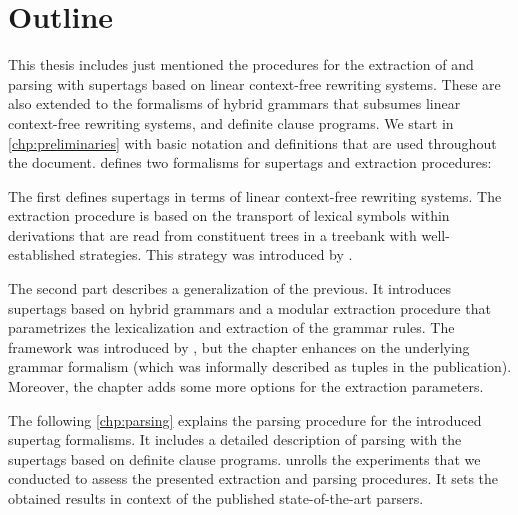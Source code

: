 \documentclass[../document.tex]{subfiles}
\begin{document}
    \section*{Outline}
    This thesis includes just mentioned the procedures for the extraction of and parsing with supertags based on linear context-free rewriting systems.
    These are also extended to the formalisms of hybrid grammars that subsumes linear context-free rewriting systems, and definite clause programs.
    We start in \cref{chp:preliminaries} with basic notation and definitions that are used throughout the document.
     defines two formalisms for supertags and extraction procedures:
    \begin{compactitem}
        \item The first defines supertags in terms of linear context-free rewriting systems.
            The extraction procedure is based on the transport of lexical symbols within derivations that are read from constituent trees in a treebank with well-established strategies.
            This strategy was introduced by \citet{RupMoe21}.
        \item The second part describes a generalization of the previous.
            It introduces supertags based on hybrid grammars and a modular extraction procedure that parametrizes the lexicalization and extraction of the grammar rules.
            The framework was introduced by \citet{Rup22}, but the chapter enhances on the underlying grammar formalism (which was informally described as tuples in the publication).
            Moreover, the chapter adds some more options for the extraction parameters.
    \end{compactitem}
    The following \cref{chp:parsing} explains the parsing procedure for the introduced supertag formalisms.
    It includes a detailed description of parsing with the supertags based on definite clause programs.
     unrolls the experiments that we conducted to assess the presented extraction and parsing procedures.
    It sets the obtained results in context of the published state-of-the-art parsers.
    
    \ifSubfilesClassLoaded{%
        \printindex
    }{}
\end{document}
